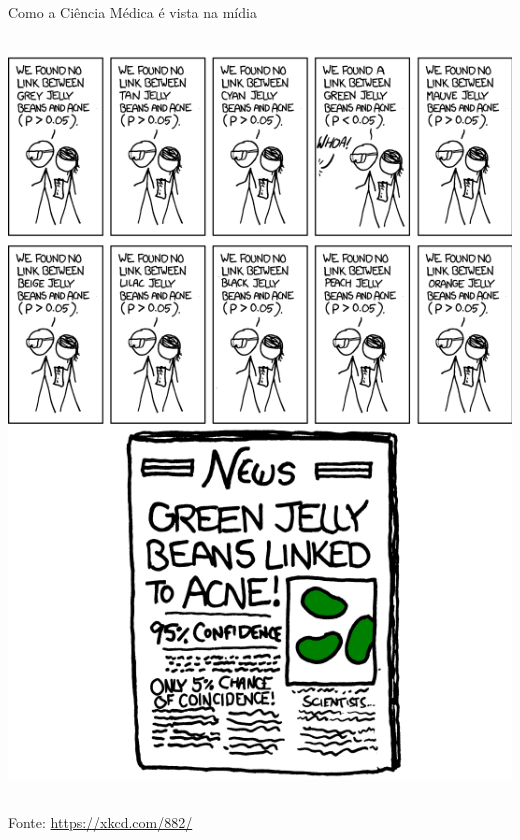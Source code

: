\documentclass{beamer}
\begin{document}
\begin{frame}{{\small Como a Ciência Médica é vista na mídia}}
\begin{columns}
\begin{column}{5cm}
\begin{center}
        \includegraphics[height=.8\textheight]{Cap10-11/xkcd-significant2}
      \end{center}
    \end{column}
  \end{columns}
  \vfill
  \begin{center}
    \scriptsize
    Fonte: \url{https://xkcd.com/882/}
  \end{center}
\end{frame}
\end{document}
